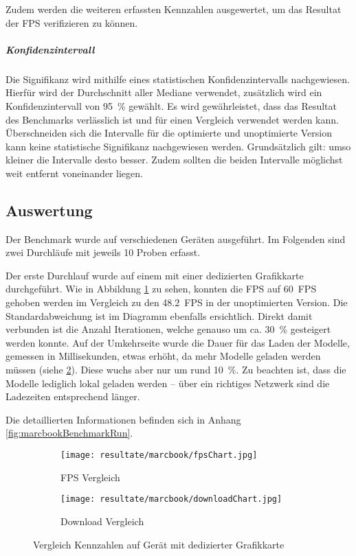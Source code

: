 Zudem werden die weiteren erfassten Kennzahlen ausgewertet, um das Resultat der \gls{FPS} verifizieren zu können.

\subparagraph{Konfidenzintervall}
Die Signifikanz wird mithilfe eines statistischen Konfidenzintervalls nachgewiesen. Hierfür wird der Durchschnitt aller Mediane verwendet, zusätzlich wird ein Konfidenzintervall von 95 \% gewählt. Es wird gewährleistet, dass das Resultat des Benchmarks verlässlich ist und für einen Vergleich verwendet werden kann. Überschneiden sich die Intervalle für die optimierte und unoptimierte Version kann keine statistische Signifikanz nachgewiesen werden. Grundsätzlich gilt: umso kleiner die Intervalle desto besser. Zudem sollten die beiden Intervalle möglichst weit entfernt voneinander liegen.

\subsection{Auswertung}
\label{chap:benchmarkResults}

Der Benchmark wurde auf verschiedenen Geräten ausgeführt. Im Folgenden sind zwei Durchläufe mit jeweils 10 Proben erfasst.

Der erste Durchlauf wurde auf einem  mit einer dedizierten Grafikkarte durchgeführt. Wie in Abbildung \ref{fig:benchmarkFpsChartMarcbook} zu sehen, konnten die \gls{FPS} auf 60 \gls{FPS} gehoben werden im Vergleich zu den 48.2 \gls{FPS} in der unoptimierten Version. Die Standardabweichung ist im Diagramm ebenfalls ersichtlich.
Direkt damit verbunden ist die Anzahl  Iterationen, welche genauso um ca. 30 \% gesteigert werden konnte. Auf der Umkehrseite wurde die Dauer für das Laden der Modelle, gemessen in Millisekunden, etwas erhöht, da mehr Modelle geladen werden müssen (siehe \ref{fig:benchmarkDownloadChartMarcbook}). Diese wuchs aber nur um rund 10 \%. Zu beachten ist, dass die Modelle lediglich lokal geladen werden – über ein richtiges Netzwerk sind die Ladezeiten entsprechend länger.

Die detaillierten Informationen befinden sich in Anhang \ref{fig:marcbookBenchmarkRun}.

\begin{figure}[H]
  \centering
  \begin{subfigure}{.49\textwidth}
    \centering
    \texttt{[image: resultate/marcbook/fpsChart.jpg]}
    \caption{\gls{FPS} Vergleich}
    \label{fig:benchmarkFpsChartMarcbook}
  \end{subfigure}
  \begin{subfigure}{.49\textwidth}
    \centering
    \texttt{[image: resultate/marcbook/downloadChart.jpg]}
    \caption{Download Vergleich}
    \label{fig:benchmarkDownloadChartMarcbook}
  \end{subfigure}
  \caption{Vergleich Kennzahlen auf Gerät mit dedizierter Grafikkarte}
  \label{fig:benchmarkChartMarcbook}
\end{figure}

